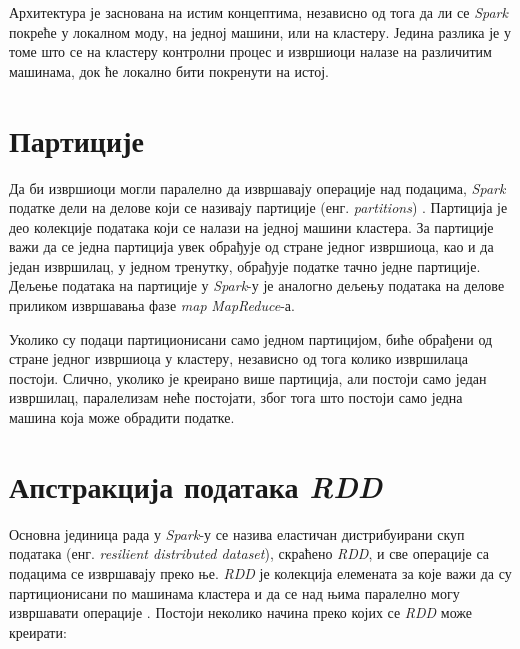 \documentclass[12pt,oneside]{memoir}
\begin{document}
Архитектура је заснована на истим концептима, независно од тога да ли се \textit{Spark} покреће у локалном моду, на једној машини, или на кластеру. Једина разлика је у томе што се на кластеру контролни процес и извршиоци налазе на различитим машинама, док ће локално бити покренути на истој.

\section{Партиције}
\label{sec:spark_partic}

Да би извршиоци могли паралелно да извршавају операције над подацима, \textit{Spark} податке дели на делове који се називају партиције (енг. \textit{partitions}) \cite{spark_guide}. Партиција је део колекције података који се налази на једној машини кластера. За партиције важи да се једна партиција увек обрађује од стране једног извршиоца, као и да један извршилац, у једном тренутку, обрађује податке тачно једне партиције. Дељење података на партиције у \textit{Spark}-у је аналогно дељењу података на делове  приликом извршавања фазе \textit{map} \textit{MapReduce}-а.



Уколико су подаци партиционисани само једном партицијом, биће обрађени од стране једног извршиоца у кластеру, независно од тога колико извршилаца постоји. Слично, уколико је креирано више партиција, али постоји само један извршилац, паралелизам неће постојати, због тога што постоји само једна машина која може обрадити податке.

\section{Апстракција података \textit{RDD}}
\label{sec:spark_rdd}

Основна јединица рада у \textit{Spark}-у се назива еластичан дистрибуирани скуп података (енг. \textit{resilient distributed dataset}), скраћено \textit{RDD}, и све операције са подацима се извршавају преко ње. \textit{RDD} је колекција елемената за које важи да су партиционисани по машинама кластера и да се над њима паралелно могу извршавати операције \cite{spark_rdd}. Постоји неколико начина преко којих се \textit{RDD} може креирати:
\end{document}
